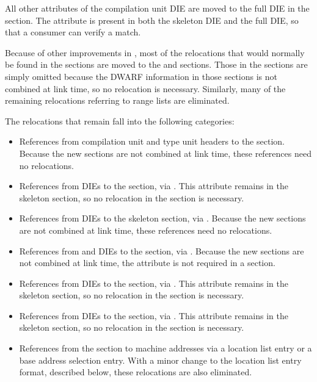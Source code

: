 All other attributes of the compilation unit DIE are moved to
the full DIE in the \dotdebuginfodwo{} section.
The \DWATdwoid{} attribute is present
in both the skeleton DIE and the full DIE, so that a consumer
can verify a match.

Because of other improvements in \DWARFVersionV, most of the
relocations that would normally be found in the \dotdebuginfodwo{}
sections are moved to the \dotdebugaddr{} and
\dotdebugstroffsetsdwo{} sections. Those in the
\dotdebugstroffsetsdwo{} sections are simply omitted because the
DWARF information in those sections is not combined at link
time, so no relocation is necessary. Similarly,
many of the remaining relocations referring to range lists are
eliminated. 

The relocations that remain fall into the following categories:
\begin{itemize}
\item
References from compilation unit and type unit headers to the
\dotdebugabbrevdwo{} section. Because the new sections are not
combined at link time, these references need no relocations.
\item
References from \DWTAGcompileunit{} DIEs to the
\dotdebuglinedwo{} section, via \DWATstmtlist{}. This attribute
remains in the skeleton \dotdebuginfo{} section, so no
relocation in the \dotdebuginfodwo{} section is necessary.
\item
References from \DWTAGtypeunit{} DIEs to the skeleton
\dotdebuglinedwo{} section, via \DWATstmtlist{}. Because the new
sections are not combined at link time, these references need
no relocations.
\item
References from \DWTAGcompileunit{} and \DWTAGtypeunit{} DIEs
to the \dotdebugstroffsetsdwo{} section, via
\DWATstroffsetsbase{}. Because the new sections are not
combined at link time, the \DWATstroffsetsbase{} attribute
is not required in a \dotdebuginfodwo{}
section.
\item
References from \DWTAGcompileunit{} DIEs to the \dotdebugaddr{}
section, via \DWATaddrbase{}. This attribute remains in
the skeleton \dotdebuginfo{} section, so no relocation in the
\dotdebuginfodwo{} section is necessary.
\item
References from \DWTAGcompileunit{} DIEs to the \dotdebugranges{}
section, via \DWATrangesbase{}. This attribute remains in
the skeleton \dotdebuginfo{} section, so no relocation in the
\dotdebuginfodwo{} section is necessary.
\item
References from the \dotdebuglocdwo{} section to machine addresses
via a location list entry or a base address selection entry.
With a minor change to the location list entry format,
described below, these relocations are also eliminated.
\end{itemize}

